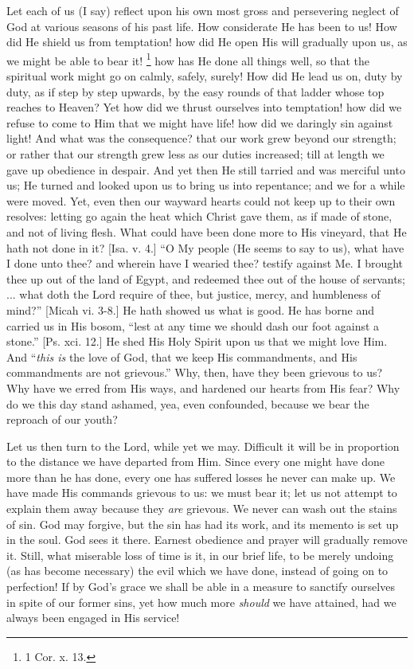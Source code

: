 Let each of us (I say) reflect upon his own most gross
and persevering neglect of God at various seasons of his
past life. How considerate He has been to us! How did He
shield us from temptation! how did He open His will
gradually upon us, as we might be able to bear it! \footnote{1 Cor. x. 13.} how has He done all things well, so that the
spiritual work might go on calmly, safely, surely! How
did He lead us on, duty by duty, as if step by step
upwards, by the easy rounds of that ladder whose top
reaches to Heaven? Yet how did we thrust ourselves into
temptation! how did we refuse to come to Him that we
might have life! how did we daringly sin against light!
And what was the consequence? that our work grew beyond
our strength; or rather that our strength grew less as
our duties increased; till at length we gave up obedience
in despair. And yet then He still tarried and was
merciful unto us; He turned and looked upon us to bring
us into repentance; and we for a while were moved. Yet,
even then our wayward hearts could not keep up to their
own resolves: letting go again the heat which Christ gave
them, as if made of stone, and not of living flesh. What
could have been done more to His vineyard, that He hath
not done in it? [Isa. v. 4.] ``O My people (He seems
to say to us), what have I done unto thee? and wherein
have I wearied thee? testify against Me. I brought thee
up out of the land of Egypt, and redeemed thee out of the
house of servants; ... what doth the Lord require of
thee, but justice, mercy, and humbleness of mind?''
[Micah vi. 3-8.] He hath showed us what is good. He has
borne and carried us in His bosom, ``lest at any time
we should dash our foot against a stone.'' [Ps. xci.
12.] He shed His Holy Spirit upon us that we might love
Him. And ``\emph{this is} the love of God, that we keep His
commandments, and His commandments are not
grievous.'' Why, then, have they been grievous to us?
Why have we erred from His ways, and hardened our hearts
from His fear? Why do we this day stand ashamed, yea,
even confounded, because we bear the reproach of our
youth?

Let us then turn to the Lord, while yet we may.
Difficult it will be in proportion to the distance we
have departed from Him. Since every one might have done
more than he has done, every one has suffered losses he
never can make up. We have made His commands grievous to
us: we must bear it; let us not attempt to explain them
away because they \emph{are} grievous. We never can wash out the
stains of sin. God may forgive, but the sin has had its
work, and its memento is set up in the soul. God sees it
there. Earnest obedience and prayer will gradually remove
it. Still, what miserable loss of time is it, in our
brief life, to be merely undoing (as has become
necessary) the evil which we have done, instead of going
on to perfection! If by God's grace we shall be able in a
measure to sanctify ourselves in spite of our former
sins, yet how much more \emph{should} we have attained,
had we always been engaged in His service!

